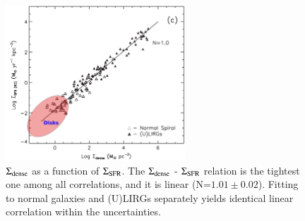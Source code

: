 \documentclass[legal,11pt]{article}
\begin{document}
\begin{figure}
\centering
\includegraphics[width=0.6\textwidth]{HCN_IR.png}
\caption{
${\rm \Sigma_{dense}}$ as a function of $\Sigma_{\rm SFR}$. The ${\rm \Sigma_{dense}}$ 
        - $\Sigma_{\rm SFR}$ relation is the tightest one among all correlations, 
        and it is linear (N=$1.01 \pm 0.02$). Fitting to normal galaxies and (U)LIRGs separately 
yields identical linear correlation within the uncertainties.} 
\label{fig:hcn-ir}
\end{figure}
\end{document}
